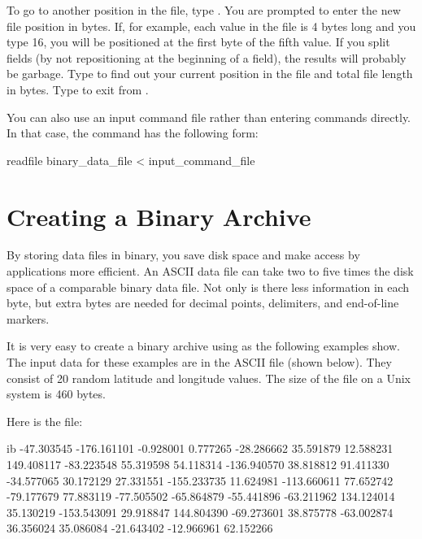To go to another position in the file, type . You are prompted
to enter the new file position in bytes. If, for example, each value
in the file is 4 bytes long and you type 16, you will be positioned at
the first byte of the fifth value. If you split fields (by not
repositioning at the beginning of a field), the results will probably
be garbage. Type  to find out your current position in the file
and total file length in bytes. Type  to exit from
.

You can also use an input command file rather than entering commands
directly. In that case, the  command has the following
form:

\begin{example}
readfile binary_data_file < input_command_file 
\end{example}

\section{Creating a Binary Archive}
\label{ff,fmtconv,binary}

By storing data files in binary, you save disk space and make access
by applications more efficient. An ASCII data file can take two to
five times the disk space of a comparable binary data file. Not only
is there less information in each byte, but extra bytes are needed for
decimal points, delimiters, and end-of-line markers.

It is very easy to create a binary archive using  as the
following examples show. The input data for these examples are in the
ASCII file  (shown below). They consist of 20 random
latitude and longitude values. The size of the file on a Unix system
is 460 bytes.

Here is the  file:

\begin{vcode}{ib}
-47.303545 -176.161101
 -0.928001    0.777265
-28.286662   35.591879
 12.588231  149.408117
-83.223548   55.319598
 54.118314 -136.940570
 38.818812   91.411330
-34.577065   30.172129
 27.331551 -155.233735
 11.624981 -113.660611
 77.652742  -79.177679
 77.883119  -77.505502
-65.864879  -55.441896
-63.211962  134.124014
 35.130219 -153.543091
 29.918847  144.804390
-69.273601   38.875778
-63.002874   36.356024
 35.086084  -21.643402
-12.966961   62.152266
\end{vcode}


